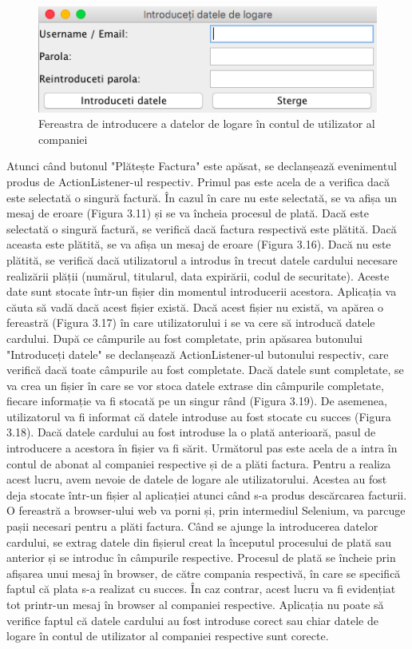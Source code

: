 \documentclass[12pt]{book}
\begin{document}
\begin{figure}[!ht]
	\centering
	\includegraphics{IntroducereDateLogare}
	\caption{Fereastra de introducere a datelor de logare în contul de utilizator al companiei}
\end{figure}

Atunci când butonul "Plătește Factura" este apăsat, se declanșează evenimentul produs de ActionListener-ul respectiv. Primul pas este acela de a verifica dacă este selectată o singură factură. În cazul în care nu este selectată, se va afișa un mesaj de eroare (Figura 3.11) și se va încheia procesul de plată. Dacă este selectată o singură factură, se verifică dacă factura respectivă este plătită. Dacă aceasta este plătită, se va afișa un mesaj de eroare (Figura 3.16). Dacă nu este plătită, se verifică dacă utilizatorul a introdus în trecut datele cardului necesare realizării plății (numărul, titularul, data expirării, codul de securitate). Aceste date sunt stocate într-un fișier din momentul introducerii acestora. Aplicația va căuta să vadă dacă acest fișier există. Dacă acest fișier nu există, va apărea o fereastră (Figura 3.17) în care utilizatorului i se va cere să introducă datele cardului. După ce câmpurile au fost completate, prin apăsarea butonului "Introduceți datele" se declanșează ActionListener-ul butonului respectiv, care verifică dacă toate câmpurile au fost completate. Dacă datele sunt completate, se va crea un fișier în care se vor stoca datele extrase din câmpurile completate, fiecare informație va fi stocată pe un singur rând (Figura 3.19). De asemenea, utilizatorul va fi informat că datele introduse au fost stocate cu succes (Figura 3.18). Dacă datele cardului au fost introduse la o plată anterioară, pasul de introducere a acestora în fișier va fi sărit. Următorul pas este acela de a intra în contul de abonat al companiei respective și de a plăti factura. Pentru a realiza acest lucru, avem nevoie de datele de logare ale utilizatorului. Acestea au fost deja stocate într-un fișier al aplicației atunci când s-a produs descărcarea facturii. O fereastră a browser-ului web va porni și, prin intermediul Selenium, va parcuge pașii necesari pentru a plăti factura. Când se ajunge la introducerea datelor cardului, se extrag datele din fișierul creat la începutul procesului de plată sau anterior și se introduc în câmpurile respective. Procesul de plată se încheie prin afișarea unui mesaj în browser, de către compania respectivă, în care se specifică faptul că plata s-a realizat cu succes. În caz contrar, acest lucru va fi evidențiat tot printr-un mesaj în browser al companiei respective. Aplicația nu poate să verifice faptul că datele cardului au fost introduse corect sau chiar datele de logare în contul de utilizator al companiei respective sunt corecte. 
\end{document}
